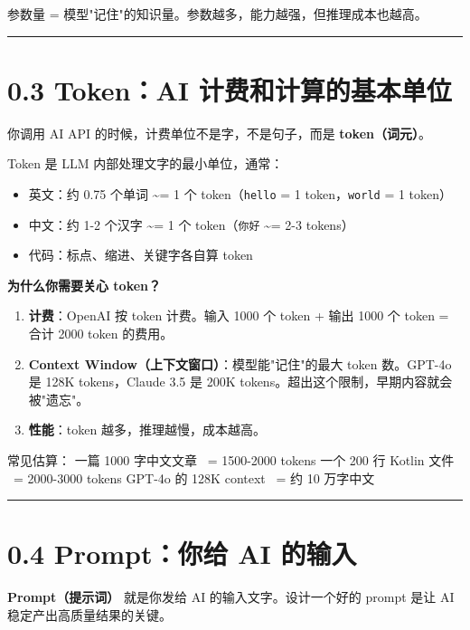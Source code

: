 参数量 = 模型"记住"的知识量。参数越多，能力越强，但推理成本也越高。


\bigskip\hrule\bigskip

\section{0.3 Token：AI 计费和计算的基本单位}

你调用 AI API 的时候，计费单位不是字，不是句子，而是 \textbf{token（词元）}。


Token 是 LLM 内部处理文字的最小单位，通常：

\begin{itemize}[leftmargin=2em]
\item 英文：约 0.75 个单词 \textasciitilde{}= 1 个 token（\texttt{hello} = 1 token，\texttt{world} = 1 token）
\item 中文：约 1-2 个汉字 \textasciitilde{}= 1 个 token（\texttt{你好} \textasciitilde{}= 2-3 tokens）
\item 代码：标点、缩进、关键字各自算 token
\end{itemize}

\textbf{为什么你需要关心 token？}


\begin{enumerate}[leftmargin=2em]
\item \textbf{计费}：OpenAI 按 token 计费。输入 1000 个 token + 输出 1000 个 token = 合计 2000 token 的费用。
\item \textbf{Context Window（上下文窗口）}：模型能"记住"的最大 token 数。GPT-4o 是 128K tokens，Claude 3.5 是 200K tokens。超出这个限制，早期内容就会被"遗忘"。
\item \textbf{性能}：token 越多，推理越慢，成本越高。
\end{enumerate}

\begin{codeblock}
常见估算：
一篇 1000 字中文文章 ~= 1500-2000 tokens
一个 200 行 Kotlin 文件 ~= 2000-3000 tokens
GPT-4o 的 128K context ~= 约 10 万字中文
\end{codeblock}

\bigskip\hrule\bigskip

\section{0.4 Prompt：你给 AI 的输入}

\textbf{Prompt（提示词）} 就是你发给 AI 的输入文字。设计一个好的 prompt 是让 AI 稳定产出高质量结果的关键。


